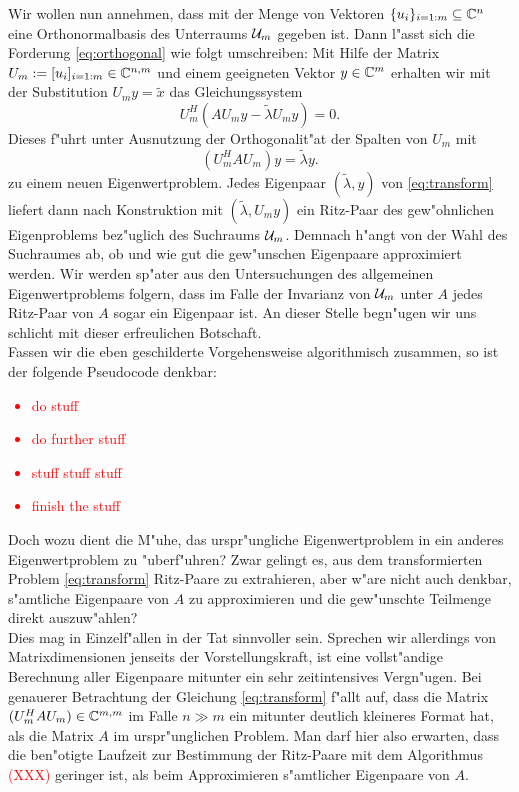 Wir wollen nun annehmen, dass mit der Menge von Vektoren $\{u_i\}_{i=1:m}\subseteq \mathbb{C}^n$ eine Orthonormalbasis
des Unterraums $\mathcal{U}_m$ gegeben ist. Dann l"asst sich die Forderung \eqref{eq:orthogonal} wie folgt
umschreiben: Mit Hilfe der Matrix
$U_m :=[u_i]_{i=1:m}\in\mathbb{C}^{n,m}$ und einem geeigneten Vektor $y\in\mathbb{C}^m$ erhalten wir
mit der Substitution $U_m y = \widetilde{x}$ das Gleichungssystem
\[
U_m^H(AU_m y - \widetilde{\lambda} U_m y) = 0.
\]
Dieses f"uhrt unter Ausnutzung der Orthogonalit"at der Spalten von $U_m$ mit%
\begin{equation}\label{eq:transform}
(U_m^H A U_m) y = \widetilde{\lambda}y.
\end{equation}
zu einem neuen Eigenwertproblem. Jedes Eigenpaar $(\widetilde{\lambda},y)$ von \eqref{eq:transform}
liefert dann nach Konstruktion mit $(\widetilde{\lambda}, U_m y)$ ein Ritz-Paar des gew"ohnlichen
Eigenproblems bez"uglich des Suchraums $\mathcal{U}_m$. Demnach h"angt von der Wahl
des Suchraumes ab, ob und wie gut die gew"unschen Eigenpaare approximiert werden.
Wir werden sp"ater aus den Untersuchungen des allgemeinen Eigenwertproblems folgern,
dass im Falle der Invarianz von $\mathcal{U}_m$ unter $A$ jedes Ritz-Paar von $A$ sogar ein Eigenpaar ist.
An dieser Stelle begn"ugen wir uns schlicht mit dieser erfreulichen Botschaft.\\

Fassen wir die eben geschilderte Vorgehensweise algorithmisch zusammen, so ist
der folgende Pseudocode denkbar:
\textcolor{red}{
\begin{itemize}
\item do stuff
\item do further stuff
\item stuff stuff stuff
\item finish the stuff
\end{itemize}}

Doch wozu dient die M"uhe, das urspr"ungliche Eigenwertproblem in ein anderes
Eigenwertproblem zu "uberf"uhren? Zwar gelingt es, aus dem transformierten Problem
\eqref{eq:transform} Ritz-Paare zu extrahieren, aber w"are nicht auch denkbar,
s"amtliche Eigenpaare von $A$ zu approximieren und die gew"unschte Teilmenge
direkt auszuw"ahlen?\\

Dies mag in Einzelf"allen in der Tat sinnvoller sein. Sprechen wir allerdings
von Matrixdimensionen jenseits der Vorstellungskraft, ist eine vollst"andige
Berechnung aller Eigenpaare mitunter ein sehr zeitintensives Vergn"ugen. Bei
genauerer Betrachtung der Gleichung \eqref{eq:transform} f"allt auf, dass die
Matrix $(U_m^H A U_m) \in \mathbb{C}^{m,m}$ im Falle $n \gg m$ ein mitunter deutlich kleineres
Format hat, als die Matrix $A$ im urspr"unglichen Problem. Man darf hier also erwarten,
dass die ben"otigte Laufzeit zur Bestimmung der Ritz-Paare mit dem Algorithmus \textcolor{red}{(XXX)}
geringer ist, als beim Approximieren s"amtlicher Eigenpaare von $A$.


